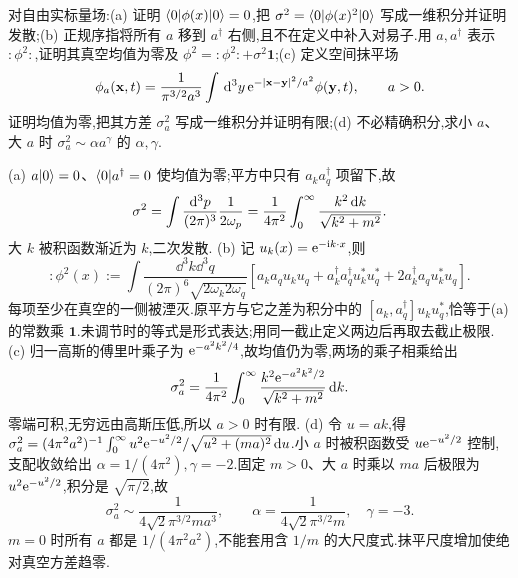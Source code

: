 \begin{exercise}
对自由实标量场:(a) 证明 $\langle 0\rvert\phi(x)\lvert 0\rangle=0$,把 $\sigma^2=\langle 0\rvert\phi(x)^2\lvert 0\rangle$ 写成一维积分并证明发散;(b) 正规序指将所有 $a$ 移到 $a^\dagger$ 右侧,且不在定义中补入对易子.用 $a,a^\dagger$ 表示 $:\phi^2:$,证明其真空均值为零及 $\phi^2=:\phi^2:+\sigma^2\mathbf1$;(c) 定义空间抹平场
\[
\phi_a(\mathbf x,t)=\frac1{\pi^{3/2}a^3}\int\,\mathrm d^3y\,\mathrm e^{-|\mathbf x-\mathbf y|^2/a^2}\phi(\mathbf y,t),\qquad a>0.
\]
证明均值为零,把其方差 $\sigma_a^2$ 写成一维积分并证明有限;(d) 不必精确积分,求小 $a$、大 $a$ 时 $\sigma_a^2\sim\alpha a^\gamma$ 的 $\alpha,\gamma$.
\end{exercise}
\begin{solution}
(a) $a\lvert 0\rangle=0$、$\langle 0\rvert a^\dagger=0$ 使均值为零;平方中只有 $a_ka_q^\dagger$ 项留下,故
\[
\sigma^2=\int\frac{\mathrm d^3p}{(2\pi)^3}\frac1{2\omega_p}=\frac1{4\pi^2}\int_0^\infty\frac{k^2\,\mathrm d k}{\sqrt{k^2+m^2}}.
\]
大 $k$ 被积函数渐近为 $k$,二次发散.
(b) 记 $u_k(x)=\mathrm e^{-\mathrm i k\cdot x}$,则
\[
:\phi^2(x):=\int\frac{\dd^3k\dd^3q}{(2\pi)^6\sqrt{2\omega_k2\omega_q}}
[a_ka_qu_ku_q+a_k^\dagger a_q^\dagger u_k^*u_q^*+2a_k^\dagger a_qu_k^*u_q].
\]
每项至少在真空的一侧被湮灭.原平方与它之差为积分中的 $[a_k,a_q^\dagger]u_ku_q^*$,恰等于(a)的常数乘 $\mathbf1$.未调节时的等式是形式表达;用同一截止定义两边后再取去截止极限.
(c) 归一高斯的傅里叶乘子为 $\mathrm e^{-a^2k^2/4}$,故均值仍为零,两场的乘子相乘给出
\[
\sigma_a^2=\frac1{4\pi^2}\int_0^\infty\frac{k^2\mathrm e^{-a^2k^2/2}}{\sqrt{k^2+m^2}}\,\mathrm d k.
\]
零端可积,无穷远由高斯压低,所以 $a>0$ 时有限.
(d) 令 $u=ak$,得 $\sigma_a^2=(4\pi^2a^2)^{-1}\int_0^\infty u^2\mathrm e^{-u^2/2}/\sqrt{u^2+(ma)^2}\,\mathrm d u$.小 $a$ 时被积函数受 $u\mathrm e^{-u^2/2}$ 控制,支配收敛给出 $\alpha=1/(4\pi^2),\gamma=-2$.固定 $m>0$、大 $a$ 时乘以 $ma$ 后极限为 $u^2\mathrm e^{-u^2/2}$,积分是 $\sqrt{\pi/2}$,故
\[
\sigma_a^2\sim\frac1{4\sqrt2\pi^{3/2}m a^3},\qquad \alpha=\frac1{4\sqrt2\pi^{3/2}m},\quad\gamma=-3.
\]
$m=0$ 时所有 $a$ 都是 $1/(4\pi^2a^2)$,不能套用含 $1/m$ 的大尺度式.抹平尺度增加使绝对真空方差趋零.
\end{solution}

